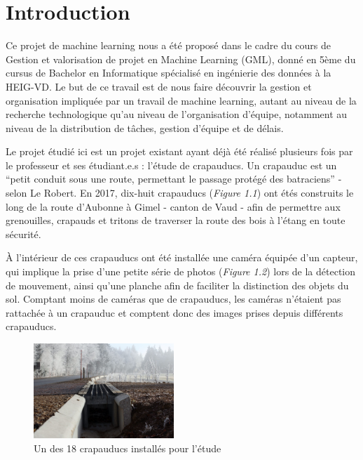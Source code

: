 \chapter{Introduction}
Ce projet de machine learning nous a été proposé dans le cadre du cours de Gestion et valorisation de projet en Machine Learning (GML), donné en 5ème du cursus de Bachelor en Informatique spécialisé en ingénierie des données à la HEIG-VD. Le but de ce travail est de nous faire découvrir la gestion et organisation impliquée par un travail de machine learning, autant au niveau de la recherche technologique qu'au niveau de l'organisation d'équipe, notamment au niveau de la distribution de tâches, gestion d'équipe et de délais. \newline

Le projet étudié ici est un projet existant ayant déjà été réalisé plusieurs fois par le professeur et ses étudiant.e.s : l'étude de crapauducs. Un crapauduc est un “petit conduit sous une route, permettant le passage protégé des batraciens” - selon Le Robert. En 2017, dix-huit crapauducs (\textit{Figure 1.1}) ont étés construits le long de la route d'Aubonne à Gimel - canton de Vaud - afin de permettre aux grenouilles, crapauds et tritons de traverser la route des bois à l'étang en toute sécurité. \newline

À l'intérieur de ces crapauducs ont été installée une caméra équipée d'un capteur, qui implique la prise d'une petite série de photos (\textit{Figure 1.2}) lors de la détection de mouvement, ainsi qu'une planche afin de faciliter la distinction des objets du sol. Comptant moins de caméras que de crapauducs, les caméras n'étaient pas rattachée à un crapauduc et comptent donc des images prises depuis différents crapauducs.\newline

\begin{figure}[!htb]
    \centering
    \includegraphics[width=200px]{images/introduction_crapauduc_exterieur.png}
    \caption{Un des 18 crapauducs installés pour l'étude}
    \label{fig:Un des 18 crapauducs installés pour l'étude}
\end{figure}


